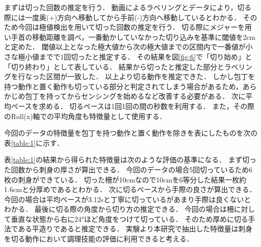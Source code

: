 まずは切った回数の推定を行う．
動画によるラベリングとデータにより，切る際には一度奥(+)方向へ移動してから手前(-)方向へ移動しているとわかる．
そのため今回は極値検出を用いて切った回数の推定を行う．
切る際にメジャーを用い手首の移動距離を調べ，一番動かしていなかった切り込みを基準に閾値を2cmと定めた．
閾値以上となった極大値から次の極大値までの区間内で一番値が小さな極小値までで1回切ったと推定する．
その結果を図\ref{fig:6}で「切り始め」と「切り終わり」として表している．
結果から切ったと推定した部分とラベリングを行なった区間が一致した．
以上より切る動作を推定できた．
しかし包丁を持つ動作と置く動作も切っている部分と判定されてしまう場合があるため，あらかじめ包丁を持ってからセンシングを始めるなど改善する必要がある．
次に平均ペースを求める．
切るペースは1回1回の間の秒数を利用する．
また，その際のRoll(x)軸での平均角度も特徴量として使用する．

今回のデータの特徴量を包丁を持つ動作と置く動作を除きを表にしたものを次の表\ref{table:1}に示す．
\begin{table}[ht]
    \centering
    \caption{特徴量}
    \label{table:1}
\end{table}
表\ref{table:1}の結果から得られた特徴量は次のような評価の基準になる．
まず切った回数から刺身の厚さが算出できる．
今回のデータの場合5回切っているため6枚の刺身ができている．
切った柵が10cmなので10cmを6等分した結果一枚約1.6cmと分厚めであるとわかる．
次に切るペースから手際の良さが算出できる．
今回の場合は平均ペースが3.12sと丁寧に切っているがあまり手際は良くないとわかる．
最後に切る際の角度から切り方の推定できる．
今回の場合は柵に対して垂直な状態から右に24°ほど角度をつけて切っている．
そのため厚めに切る手法である平造りであると推定できる．
実験より本研究で抽出した特徴量は刺身を切る動作において調理技能の評価に利用できると考える．

